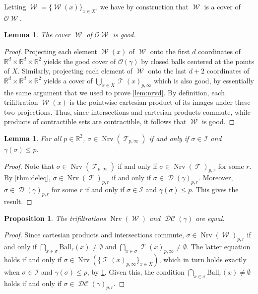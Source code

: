 \documentclass[11pt]{amsart}
\newcommand{\R}{\mathbb{R}} %
\newcommand{\Ball}{\text{Ball}}
\DeclareMathOperator{\Nrv}{Nrv}
\DeclareMathOperator{\Del}{\mathcal{D}}
\DeclareMathOperator{\TelVor}{\mathcal{T}}
\DeclareMathOperator{\TelDC}{\mathcal W}
\DeclareMathOperator{\DelCech}{\mathcal{DC}}
\newcommand{\Incr}[0]{\mathcal{I}}
\theoremstyle{plain}
\newtheorem{lemma}[theorem]{Lemma}
\newtheorem{proposition}[theorem]{Proposition}
\theoremstyle{definition}
\theoremstyle{remark}
\begin{document}
%
Letting $\TelDC=\{\TelDC(x)\}_{x\in X}$, we have by construction that $\TelDC$ is a cover of~$\mathcal O\TelDC$.
%
\begin{lemma}\label{lem:nrvdc}
The cover $\TelDC$ of $\mathcal O\TelDC$ is good.  
\end{lemma}
%
\begin{proof}
Projecting each element $\TelDC(x)$ of $\TelDC$ onto the first $d$ coordinates of $\R^d\times \R^d\times \R^2$ yields the good cover of $\mathcal O(\gamma)$ by closed balls centered at the points of $X$.  Similarly, projecting each element of $\TelDC$ onto the last $d+2$ coordinates of $\R^d\times \R^d\times \R^2$ yields a cover of $\bigcup_{x\in X} 
\TelVor(x)_{p,\infty}$ which is also good, by essentially the same argument that we used to prove \cref{lem:nrvd}.  By definition, each trifiltration $\TelDC(x)$ is the pointwise cartesian product of its images under these two projections.  Thus, since intersections and cartesian products commute, while products of contractible sets are contractible, it follows that $\TelDC$ is good.
\end{proof}
%
\begin{lemma}\label{Lem:Incr_Vs_Nerve_Over_P}
For all $p\in \R^2$, $\sigma\in \Nrv(\TelVor_{p,\infty})$ if and only if $\sigma\in \Incr$ and $\gamma(\sigma)\leq p$.
\end{lemma}
%
\begin{proof}
Note that $\sigma\in \Nrv(\TelVor_{p,\infty})$ if and only if $\sigma \in  \Nrv(\TelVor)_{p,r}$ for some $r$.  By \cref{thm:deleq}, $\sigma \in  \Nrv(\TelVor)_{p,r}$ if and only if $\sigma\in \Del(\gamma)_{p,r}$.  Moreover, $\sigma \in\Del(\gamma)_{p,r}$ for some $r$ if and only if $\sigma\in \Incr$ and $\gamma(\sigma)\leq p$.    This gives the result.  
\end{proof}
%
%
%
\begin{proposition} \label{thm:delcecheq}
     The trifiltrations $\Nrv(\TelDC)$ and  $\DelCech(\gamma)$ are equal.
 \end{proposition}
%
%
%
\begin{proof}
 Since cartesian products and intersections commute, $\sigma \in \Nrv(\TelDC)_{p,r}$ if and only if $\bigcap_{x\in \sigma}\Ball_r(x) \neq\emptyset$ and $\bigcap_{x\in \sigma}\TelVor(x)_{p,\infty} \neq\emptyset$.  The latter equation holds if and only if $\sigma \in \Nrv(\{\TelVor(x)_{p,\infty}\}_{x\in X})$, which  in turn holds exactly when  $\sigma\in \Incr$ and $\gamma(\sigma)\leq p$, by \cref{Lem:Incr_Vs_Nerve_Over_P}.  Given this, the condition $\bigcap_{x\in \sigma}\Ball_r(x) \neq\emptyset$ holds if and only if $\sigma \in \DelCech(\gamma)_{p,r}$.
\end{proof}
\end{document}
